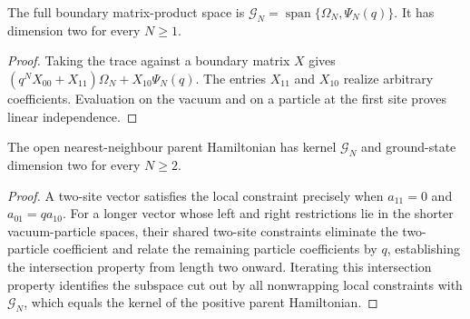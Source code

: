 \begin{lemma}
    \label{thm:pvbs_open_space}
    \leanok
    The full boundary matrix-product space is
    $\mathcal G_N=\operatorname{span}\{\Omega_N,\Psi_N(q)\}$.
    It has dimension two for every $N\ge1$.
\end{lemma}
\begin{proof}
    \leanok
    Taking the trace against a boundary matrix $X$ gives
    $(q^NX_{00}+X_{11})\Omega_N+X_{10}\Psi_N(q)$.
    The entries $X_{11}$ and $X_{10}$ realize arbitrary coefficients.
    Evaluation on the vacuum and on a particle at the first site proves
    linear independence.
\end{proof}

\begin{lemma}
    \label{thm:pvbs_open_parent}
    \leanok
    The open nearest-neighbour parent Hamiltonian has kernel $\mathcal G_N$
    and ground-state dimension two for every $N\ge2$.
\end{lemma}
\begin{proof}
    \leanok
    A two-site vector satisfies the local constraint precisely when
    $a_{11}=0$ and $a_{01}=q a_{10}$. For a longer vector whose left and right
    restrictions lie in the shorter vacuum-particle spaces, their shared
    two-site constraints eliminate the two-particle coefficient and relate the
    remaining particle coefficients by $q$, establishing the intersection
    property from length two onward. Iterating this intersection property
    identifies the subspace cut out by all nonwrapping local constraints with
    $\mathcal G_N$, which equals the kernel of the positive parent
    Hamiltonian.
\end{proof}

